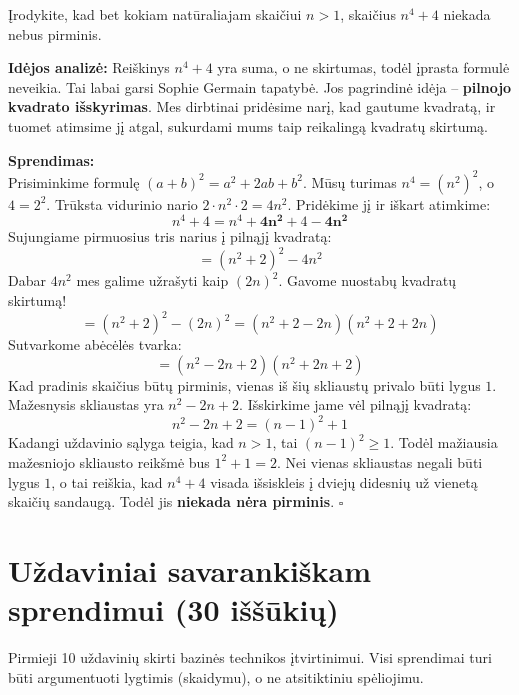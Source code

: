 \documentclass[11pt,a4paper]{scrartcl}
\newenvironment{solution}
    {\begin{list}{}{\setlength{\leftmargin}{10pt}\setlength{\rightmargin}{10pt}}\item[]}
    {\end{list}}
\begin{document}
\begin{example}
Įrodykite, kad bet kokiam natūraliajam skaičiui $n > 1$, skaičius $n^4 + 4$ niekada nebus pirminis.
\end{example}
\begin{solution}
\textbf{Idėjos analizė:} Reiškinys $n^4 + 4$ yra suma, o ne skirtumas, todėl įprasta formulė neveikia. Tai labai garsi Sophie Germain tapatybė. Jos pagrindinė idėja – \textbf{pilnojo kvadrato išskyrimas}. Mes dirbtinai pridėsime narį, kad gautume kvadratą, ir tuomet atimsime jį atgal, sukurdami mums taip reikalingą kvadratų skirtumą.

\textbf{Sprendimas:}\\
Prisiminkime formulę $(a+b)^2 = a^2 + 2ab + b^2$. Mūsų turimas $n^4 = (n^2)^2$, o $4 = 2^2$. Trūksta vidurinio nario $2 \cdot n^2 \cdot 2 = 4n^2$. Pridėkime jį ir iškart atimkime:
$$ n^4 + 4 = n^4 + \mathbf{4n^2} + 4 - \mathbf{4n^2} $$
Sujungiame pirmuosius tris narius į pilnąjį kvadratą:
$$ = (n^2 + 2)^2 - 4n^2 $$
Dabar $4n^2$ mes galime užrašyti kaip $(2n)^2$. Gavome nuostabų kvadratų skirtumą!
$$ = (n^2 + 2)^2 - (2n)^2 = (n^2 + 2 - 2n)(n^2 + 2 + 2n) $$
Sutvarkome abėcėlės tvarka:
$$ = (n^2 - 2n + 2)(n^2 + 2n + 2) $$
Kad pradinis skaičius būtų pirminis, vienas iš šių skliaustų privalo būti lygus $1$. 
Mažesnysis skliaustas yra $n^2 - 2n + 2$. Išskirkime jame vėl pilnąjį kvadratą:
$$ n^2 - 2n + 2 = (n - 1)^2 + 1 $$
Kadangi uždavinio sąlyga teigia, kad $n > 1$, tai $(n-1)^2 \ge 1$. Todėl mažiausia mažesniojo skliausto reikšmė bus $1^2 + 1 = 2$.
Nei vienas skliaustas negali būti lygus $1$, o tai reiškia, kad $n^4+4$ visada išsiskleis į dviejų didesnių už vienetą skaičių sandaugą. Todėl jis \textbf{niekada nėra pirminis}. \hfill $\square$
\end{solution}

\vspace{0.5cm}

\newpage
\section{Uždaviniai savarankiškam sprendimui (30 iššūkių)}

Pirmieji 10 uždavinių skirti bazinės technikos įtvirtinimui. Visi sprendimai turi būti argumentuoti lygtimis (skaidymu), o ne atsitiktiniu spėliojimu.
\end{document}
